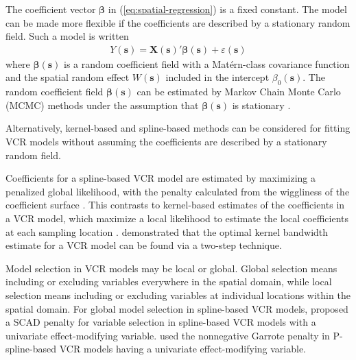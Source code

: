 \documentclass[authoryear, review, 11pt]{elsarticle}
\begin{document}
	The coefficient vector $\bm{\beta}$ in (\ref{eq:spatial-regression}) is a fixed constant. The model can be made more flexible if the coefficients are described by a stationary random field. Such a model is written
\begin{align}\label{eq:SVCR-process}
    Y(\bm{s}) = \bm{X}(\bm{s})'\bm{\beta}(\bm{s}) + \varepsilon(\bm{s})
\end{align}
	where $\bm{\beta}(\bm{s})$ is a random coefficient field with a Mat\'{e}rn-class covariance function and the spatial random effect $W(\bm{s})$ included in the intercept $\beta_0(\bm{s})$. The random coefficient field $\bm{\beta}(\bm{s})$ can be estimated by Markov Chain Monte Carlo (MCMC) methods under the assumption that $\bm{\beta}(\bm{s})$ is stationary \citep{Gelfand:2003}.


	Alternatively, kernel-based and spline-based methods can be considered for fitting VCR models without assuming the coefficients are described by a stationary random field. 

Coefficients for a spline-based VCR model are estimated by maximizing a penalized global likelihood, with the penalty calculated from the wiggliness of the coefficient surface \citep{Wood:2006}. This contrasts to kernel-based estimates of the coefficients in a VCR model, which maximize a local likelihood to estimate the local coefficients at each sampling location \citep{Loader:1999}. \cite{Fan:1999} demonstrated that the optimal kernel bandwidth estimate for a VCR model can be found via a two-step technique.
	
	Model selection in VCR models may be local or global. Global selection means including or excluding variables everywhere in the spatial domain, while local selection means including or excluding variables at individual locations within the spatial domain. For global model selection in spline-based VCR models, \cite{Wang:2008a} proposed a SCAD penalty \citep{Fan:2001} for variable selection in spline-based VCR models with a univariate effect-modifying variable. \cite{Antoniadis:2012a} used the nonnegative Garrote penalty \citep{Breiman:1995} in P-spline-based VCR models having a univariate effect-modifying variable.
	
\end{document}
